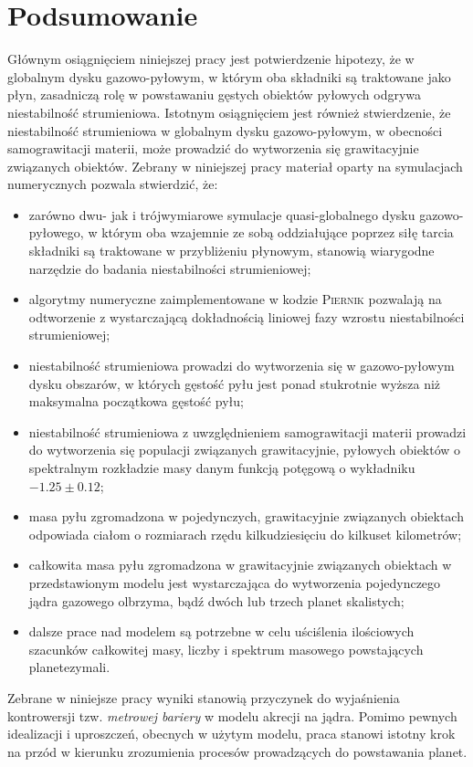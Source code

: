 
\chapter{Podsumowanie}

Głównym osiągnięciem niniejszej pracy jest potwierdzenie hipotezy, że w globalnym
dysku gazowo-pyłowym, w którym oba składniki są traktowane jako płyn, zasadniczą
rolę w
powstawaniu gęstych obiektów pyłowych odgrywa niestabilność strumieniowa. 
Istotnym osiągnięciem jest również stwierdzenie, że niestabilność
strumieniowa w globalnym dysku gazowo-pyłowym, w obecności samograwitacji
materii, może prowadzić do wytworzenia się grawitacyjnie związanych obiektów.
Zebrany w niniejszej pracy materiał oparty na symulacjach numerycznych
pozwala stwierdzić, że:

\begin{itemize}
   \item zarówno dwu- jak i trójwymiarowe symulacje quasi-globalnego dysku
      gazowo-pyłowego, w którym oba wzajemnie ze sobą oddziałujące poprzez siłę
      tarcia składniki są traktowane w przybliżeniu płynowym, stanowią wiarygodne
      narzędzie do badania niestabilności strumieniowej;
   \item algorytmy numeryczne zaimplementowane w kodzie \textsc{Piernik}
      pozwalają na odtworzenie z wystarczającą dokładnością liniowej fazy
      wzrostu niestabilności strumieniowej;
   \item niestabilność strumieniowa prowadzi do wytworzenia się w gazowo-pyłowym
      dysku obszarów, w których gęstość pyłu jest ponad stukrotnie wyższa niż
      maksymalna początkowa gęstość pyłu;
   \item niestabilność strumieniowa z uwzględnieniem samograwitacji materii
      prowadzi do wytworzenia się populacji związanych grawitacyjnie, pyłowych
      obiektów o spektralnym rozkładzie masy danym funkcją potęgową o wykładniku
      $-1.25\pm0.12$;
   \item masa pyłu zgromadzona w pojedynczych, grawitacyjnie związanych obiektach
      odpowiada ciałom o rozmiarach rzędu kilkudziesięciu do kilkuset
      kilometrów;
   \item całkowita masa pyłu zgromadzona w grawitacyjnie związanych obiektach w
      przedstawionym modelu 
      jest wystarczająca do wytworzenia pojedynczego jądra gazowego
      olbrzyma, bądź dwóch lub trzech planet skalistych;
   \item dalsze prace nad modelem są potrzebne w celu uściślenia ilościowych
      szacunków całkowitej masy, liczby i spektrum masowego powstających
      planetezymali.
\end{itemize}
Zebrane w niniejsze pracy wyniki stanowią przyczynek do wyjaśnienia
kontrowersji tzw. \emph{metrowej bariery} w modelu akrecji na
jądra. Pomimo pewnych idealizacji i uproszczeń, obecnych w użytym modelu, praca
stanowi istotny krok na przód w kierunku zrozumienia procesów
prowadzących do powstawania planet.

